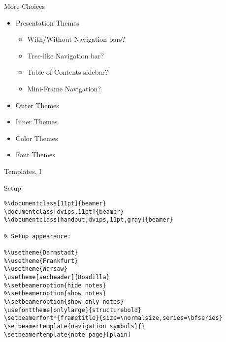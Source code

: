 \documentclass[dvips,11pt]{beamer}
\begin{document}
\begin{frame}{More Choices}
\begin{itemize}
\item Presentation Themes
\begin{itemize}
\item With/Without Navigation bars?
\item Tree-like Navigation bar?
\item Table of Contents sidebar? 
\item Mini-Frame Navigation? 
\end{itemize}
\item Outer Themes
\item Inner Themes
\item Color Themes
\item Font Themes
\end{itemize}
\end{frame}

\begin{frame}[fragile=singleslide]{Templates, I}
\begin{block}{Setup}
\tiny
\begin{verbatim}
%\documentclass[11pt]{beamer}
\documentclass[dvips,11pt]{beamer}
%\documentclass[handout,dvips,11pt,gray]{beamer}

% Setup appearance:

%\usetheme{Darmstadt}
%\usetheme{Frankfurt}
%\usetheme{Warsaw}
\usetheme[secheader]{Boadilla}
%\setbeameroption{hide notes}
%\setbeameroption{show notes}
%\setbeameroption{show only notes}
\usefonttheme[onlylarge]{structurebold}
\setbeamerfont*{frametitle}{size=\normalsize,series=\bfseries}
\setbeamertemplate{navigation symbols}{}
\setbeamertemplate{note page}[plain]
\end{verbatim}
\end{block}
\end{frame}
\end{document}
